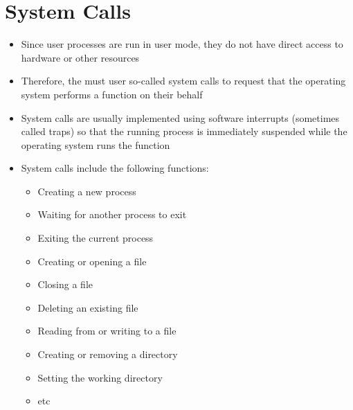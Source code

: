\section*{System Calls}

\begin{itemize}
  \item Since user processes are run in user mode, they do not have direct access to hardware or other resources
  \item Therefore, the must user so-called system calls to request that the operating system performs a function on their behalf
  \item System calls are usually implemented using software interrupts (sometimes called traps) so that the running process is immediately suspended while the operating system runs the function
  \item System calls include the following functions:
  \begin{itemize}
    \item Creating a new process
    \item Waiting for another process to exit
    \item Exiting the current process
    \item Creating or opening a file
    \item Closing a file
    \item Deleting an existing file
    \item Reading from or writing to a file
    \item Creating or removing a directory
    \item Setting the working directory
    \item etc
  \end{itemize}
\end{itemize}